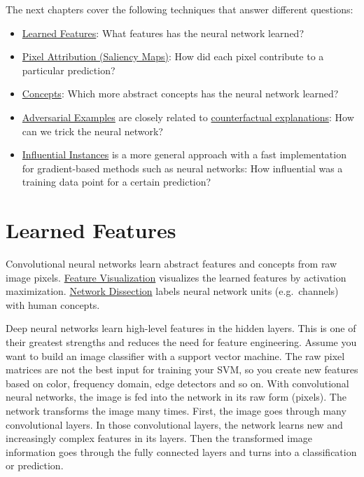 \documentclass[
  10pt,
]{scrbook}
\providecommand{\tightlist}{%
  \setlength{\itemsep}{0pt}\setlength{\parskip}{0pt}}
\begin{document}
The next chapters cover the following techniques that answer different questions:

\begin{itemize}
\tightlist
\item
  \protect\hyperlink{feature-visualization}{Learned Features}: What features has the neural network learned?
\item
  \protect\hyperlink{pixel-attribution}{Pixel Attribution (Saliency Maps)}: How did each pixel contribute to a particular prediction?
\item
  \protect\hyperlink{neural-concepts}{Concepts}: Which more abstract concepts has the neural network learned?
\item
  \protect\hyperlink{adversarial}{Adversarial Examples} are closely related to \protect\hyperlink{counterfactual}{counterfactual explanations}: How can we trick the neural network?
\item
  \protect\hyperlink{influential}{Influential Instances} is a more general approach with a fast implementation for gradient-based methods such as neural networks: How influential was a training data point for a certain prediction?
\end{itemize}

\newpage

\hypertarget{cnn-features}{%
\section{Learned Features}\label{cnn-features}}

Convolutional neural networks learn abstract features and concepts from raw image pixels.
\protect\hyperlink{feature-visualization}{Feature Visualization} visualizes the learned features by activation maximization.
\protect\hyperlink{network-dissection}{Network Dissection} labels neural network units (e.g.~channels) with human concepts.

Deep neural networks learn high-level features in the hidden layers.
This is one of their greatest strengths and reduces the need for feature engineering.
Assume you want to build an image classifier with a support vector machine.
The raw pixel matrices are not the best input for training your SVM, so you create new features based on color, frequency domain, edge detectors and so on.
With convolutional neural networks, the image is fed into the network in its raw form (pixels).
The network transforms the image many times.
First, the image goes through many convolutional layers.
In those convolutional layers, the network learns new and increasingly complex features in its layers.
Then the transformed image information goes through the fully connected layers and turns into a classification or prediction.
\end{document}

